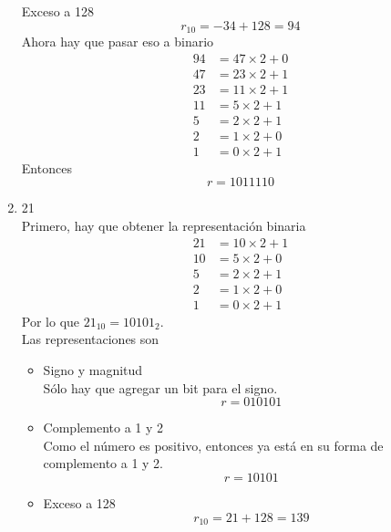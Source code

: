 \documentclass{article}
\begin{document}
\begin{enumerate}
{\begin{itemize}
{                    Exceso a 128
                    \[r_{10} = -34 + 128 = 94\]
                    Ahora hay que pasar eso a binario
                    \begin{align*}
                        94 &= 47 \times 2 + 0 \\
                        47 &= 23 \times 2 + 1 \\
                        23 &= 11 \times 2 + 1 \\
                        11 &= 5 \times 2 + 1 \\
                        5 &= 2 \times 2 + 1 \\
                        2 &= 1 \times 2 + 0 \\
                        1 &= 0 \times 2 + 1 
                    \end{align*}
                    Entonces
                    \[r = 1011110\]
                }
            \end{itemize}
        }
        \item {
            21 \\
            Primero, hay que obtener la representación binaria
            \begin{align*}
                21 &= 10 \times 2 + 1 \\
                10 &= 5 \times 2 + 0 \\
                5 &= 2 \times 2 + 1 \\
                2 &= 1 \times 2 + 0 \\
                1 &= 0 \times 2 + 1 
            \end{align*}
            Por lo que $21_{10} = 10101_{2}$.\\
            Las representaciones son 
            \begin{itemize}
                \item {
                    Signo y magnitud \\
                    Sólo hay que agregar un bit para el signo.
                    \[r = 010101\]
                    }
                \item {
                    Complemento a 1 y 2\\
                    Como el número es positivo, entonces ya está
                    en su forma de complemento a 1 y 2.
                    \[r = 10101\]
                    }
                    \item {
                    Exceso a 128
                    \[r_{10} = 21 + 128 = 139\]
}
\end{itemize}}
\end{enumerate}
\end{document}
